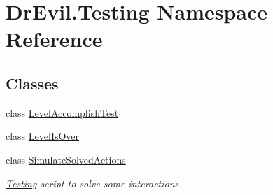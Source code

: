 \hypertarget{namespace_dr_evil_1_1_testing}{}\section{Dr\+Evil.\+Testing Namespace Reference}
\label{namespace_dr_evil_1_1_testing}
\subsection*{Classes}
\begin{DoxyCompactItemize}
\item 
class \mbox{\hyperlink{class_dr_evil_1_1_testing_1_1_level_accomplish_test}{Level\+Accomplish\+Test}}
\item 
class \mbox{\hyperlink{class_dr_evil_1_1_testing_1_1_level_is_over}{Level\+Is\+Over}}
\item 
class \mbox{\hyperlink{class_dr_evil_1_1_testing_1_1_simulate_solved_actions}{Simulate\+Solved\+Actions}}
\begin{DoxyCompactList}\small\item\em \mbox{\hyperlink{namespace_dr_evil_1_1_testing}{Testing}} script to solve some interactions \end{DoxyCompactList}\end{DoxyCompactItemize}
